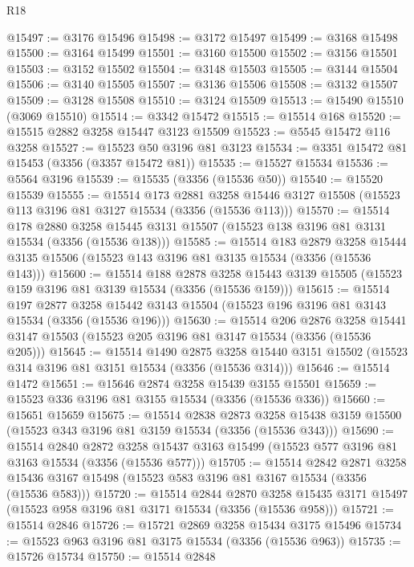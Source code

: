 \begin{lexlean}{R18}
\begin{coremodule}
@15497 := @3176 @15496
@15498 := @3172 @15497
@15499 := @3168 @15498
@15500 := @3164 @15499
@15501 := @3160 @15500
@15502 := @3156 @15501
@15503 := @3152 @15502
@15504 := @3148 @15503
@15505 := @3144 @15504
@15506 := @3140 @15505
@15507 := @3136 @15506
@15508 := @3132 @15507
@15509 := @3128 @15508
@15510 := @3124 @15509
@15513 := @15490 @15510 (@3069 @15510)
@15514 := @3342 @15472
@15515 := @15514 @168
@15520 := @15515 @2882 @3258 @15447 @3123 @15509
@15523 := @5545 @15472 @116 @3258
@15527 := @15523 @50 @3196 @81 @3123
@15534 := @3351 @15472 @81 @15453 (@3356 (@3357 @15472 @81))
@15535 := @15527 @15534
@15536 := @5564 @3196
@15539 := @15535 (@3356 (@15536 @50))
@15540 := @15520 @15539
@15555 := @15514
    @173
    @2881
    @3258
    @15446
    @3127
    @15508
    (@15523 @113 @3196 @81 @3127 @15534 (@3356 (@15536 @113)))
@15570 := @15514
    @178
    @2880
    @3258
    @15445
    @3131
    @15507
    (@15523 @138 @3196 @81 @3131 @15534 (@3356 (@15536 @138)))
@15585 := @15514
    @183
    @2879
    @3258
    @15444
    @3135
    @15506
    (@15523 @143 @3196 @81 @3135 @15534 (@3356 (@15536 @143)))
@15600 := @15514
    @188
    @2878
    @3258
    @15443
    @3139
    @15505
    (@15523 @159 @3196 @81 @3139 @15534 (@3356 (@15536 @159)))
@15615 := @15514
    @197
    @2877
    @3258
    @15442
    @3143
    @15504
    (@15523 @196 @3196 @81 @3143 @15534 (@3356 (@15536 @196)))
@15630 := @15514
    @206
    @2876
    @3258
    @15441
    @3147
    @15503
    (@15523 @205 @3196 @81 @3147 @15534 (@3356 (@15536 @205)))
@15645 := @15514
    @1490
    @2875
    @3258
    @15440
    @3151
    @15502
    (@15523 @314 @3196 @81 @3151 @15534 (@3356 (@15536 @314)))
@15646 := @15514 @1472
@15651 := @15646 @2874 @3258 @15439 @3155 @15501
@15659 := @15523 @336 @3196 @81 @3155 @15534 (@3356 (@15536 @336))
@15660 := @15651 @15659
@15675 := @15514
    @2838
    @2873
    @3258
    @15438
    @3159
    @15500
    (@15523 @343 @3196 @81 @3159 @15534 (@3356 (@15536 @343)))
@15690 := @15514
    @2840
    @2872
    @3258
    @15437
    @3163
    @15499
    (@15523 @577 @3196 @81 @3163 @15534 (@3356 (@15536 @577)))
@15705 := @15514
    @2842
    @2871
    @3258
    @15436
    @3167
    @15498
    (@15523 @583 @3196 @81 @3167 @15534 (@3356 (@15536 @583)))
@15720 := @15514
    @2844
    @2870
    @3258
    @15435
    @3171
    @15497
    (@15523 @958 @3196 @81 @3171 @15534 (@3356 (@15536 @958)))
@15721 := @15514 @2846
@15726 := @15721 @2869 @3258 @15434 @3175 @15496
@15734 := @15523 @963 @3196 @81 @3175 @15534 (@3356 (@15536 @963))
@15735 := @15726 @15734
@15750 := @15514
    @2848

\end{coremodule}
\end{lexlean}
